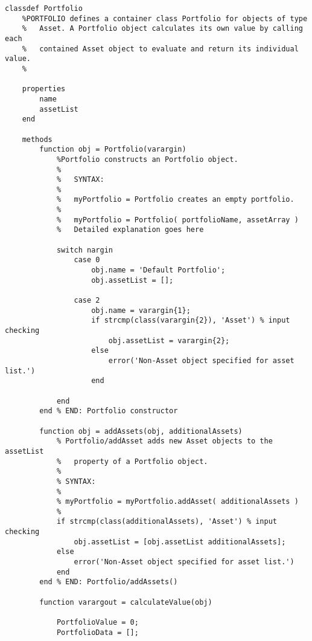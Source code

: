\begin{lstlisting}[style=Matlab-editor, caption={The class definition for \texttt{Portfolio}, a container class for objects of class \texttt{Asset}.}, label={lst:PortfolioClass}]
classdef Portfolio
    %PORTFOLIO defines a container class Portfolio for objects of type
    %   Asset. A Portfolio object calculates its own value by calling each
    %   contained Asset object to evaluate and return its individual value.
    %
    
    properties
        name
        assetList
    end
    
    methods
        function obj = Portfolio(varargin)
            %Portfolio constructs an Portfolio object.
            %
            %   SYNTAX:
            %
            %   myPortfolio = Portfolio creates an empty portfolio.
            %
            %   myPortfolio = Portfolio( portfolioName, assetArray )
            %   Detailed explanation goes here
            
            switch nargin
                case 0
                    obj.name = 'Default Portfolio';
                    obj.assetList = [];
                    
                case 2
                    obj.name = varargin{1};
                    if strcmp(class(varargin{2}), 'Asset') % input checking
                        obj.assetList = varargin{2};
                    else
                        error('Non-Asset object specified for asset list.')
                    end

            end 
        end % END: Portfolio constructor
        
        function obj = addAssets(obj, additionalAssets)
            % Portfolio/addAsset adds new Asset objects to the assetList
            %   property of a Portfolio object.
            %
            % SYNTAX:
            %
            % myPortfolio = myPortfolio.addAsset( additionalAssets )
            %   
            if strcmp(class(additionalAssets), 'Asset') % input checking
                obj.assetList = [obj.assetList additionalAssets];
            else
                error('Non-Asset object specified for asset list.')
            end    
        end % END: Portfolio/addAssets()
        
        function varargout = calculateValue(obj)
            
            PortfolioValue = 0;
            PortfolioData = [];
            

\end{lstlisting}
